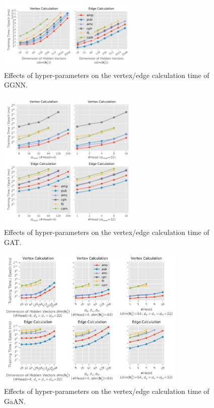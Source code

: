 \begin{figure}[H]
    \centering
    \includegraphics[width=0.6\textwidth]{figs/experiments/exp_hyperparameter_on_vertex_edge_phase_time_ggnn.pdf}
    \caption{Effects of hyper-parameters on the vertex/edge calculation time of GGNN.}
    \label{fig:exp_hyperparameter_on_vertex_edge_phase_time_ggnn}
\end{figure}

\begin{figure}[H]
    \centering
    \includegraphics[width=0.6\textwidth]{figs/experiments/exp_hyperparameter_on_vertex_edge_phase_time_gat.pdf}
    \caption{Effects of hyper-parameters on the vertex/edge calculation time of GAT.}
    \label{fig:exp_hyperparameter_on_vertex_edge_phase_time_gat}
\end{figure}

\begin{figure}[H]
    \centering
    \includegraphics[width=0.8\textwidth]{figs/experiments/exp_hyperparameter_on_vertex_edge_phase_time_gaan.pdf}
    \caption{Effects of hyper-parameters on the vertex/edge calculation time of GaAN.}
    \label{fig:exp_hyperparameter_on_vertex_edge_phase_time_gaan}
\end{figure}

